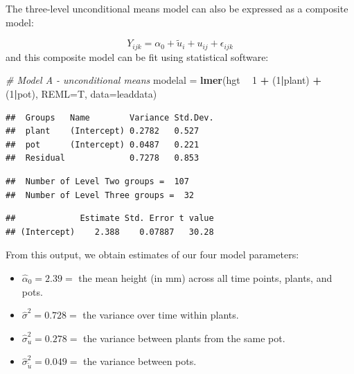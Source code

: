 \documentclass[
]{krantz}
\newenvironment{Shaded}{\begin{snugshade}}{\end{snugshade}}
\newcommand{\CommentTok}[1]{\textcolor[rgb]{0.37,0.37,0.37}{\textit{#1}}}
\newcommand{\DataTypeTok}[1]{\textcolor[rgb]{0.27,0.27,0.27}{#1}}
\newcommand{\DecValTok}[1]{\textcolor[rgb]{0.06,0.06,0.06}{#1}}
\newcommand{\KeywordTok}[1]{\textcolor[rgb]{0.27,0.27,0.27}{\textbf{#1}}}
\newcommand{\NormalTok}[1]{#1}
\newcommand{\OperatorTok}[1]{\textcolor[rgb]{0.43,0.43,0.43}{\textbf{#1}}}
\newcommand{\StringTok}[1]{\textcolor[rgb]{0.5,0.5,0.5}{#1}}
\providecommand{\tightlist}{%
  \setlength{\itemsep}{0pt}\setlength{\parskip}{0pt}}
\begin{document}
The three-level unconditional means model can also be expressed as a composite model:

\begin{equation}
Y_{ijk}=\alpha_{0}+\tilde{u}_{i}+u_{ij}+\epsilon_{ijk}
\label{eq:initununcomp}
\end{equation}
and this composite model can be fit using statistical software:

\begin{Shaded}
\begin{Highlighting}[]
\CommentTok{# Model A - unconditional means}
\NormalTok{modelal =}\StringTok{ }\KeywordTok{lmer}\NormalTok{(hgt }\OperatorTok{~}\StringTok{ }\DecValTok{1} \OperatorTok{+}\StringTok{ }\NormalTok{(}\DecValTok{1}\OperatorTok{|}\NormalTok{plant) }\OperatorTok{+}\StringTok{ }\NormalTok{(}\DecValTok{1}\OperatorTok{|}\NormalTok{pot), }
               \DataTypeTok{REML=}\NormalTok{T, }\DataTypeTok{data=}\NormalTok{leaddata)}
\end{Highlighting}
\end{Shaded}

\begin{verbatim}
##  Groups   Name        Variance Std.Dev.
##  plant    (Intercept) 0.2782   0.527   
##  pot      (Intercept) 0.0487   0.221   
##  Residual             0.7278   0.853
\end{verbatim}

\begin{verbatim}
##  Number of Level Two groups =  107 
##  Number of Level Three groups =  32
\end{verbatim}

\begin{verbatim}
##             Estimate Std. Error t value
## (Intercept)    2.388    0.07887   30.28
\end{verbatim}

From this output, we obtain estimates of our four model parameters:

\begin{itemize}
\tightlist
\item
  \(\hat{\alpha}_{0}=2.39=\) the mean height (in mm) across all time points, plants, and pots.
\item
  \(\hat{\sigma}^2=0.728=\) the variance over time within plants.
\item
  \(\hat{\sigma}_{u}^{2}=0.278=\) the variance between plants from the same pot.
\item
  \(\hat{\sigma}_{\tilde{u}}^{2}=0.049=\) the variance between pots.
\end{itemize}
\end{document}
